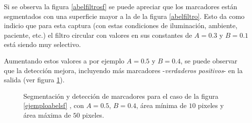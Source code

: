 Si se observa la figura \ref{abelfiltrosf} se puede apreciar que los marcadores están segmentados con una superficie mayor a la de la figura \ref{abelfiltro}.  Esto da como indicio que para esta captura (con estas condiciones de iluminación, ambiente, paciente, etc.) el filtro circular con valores en sus constantes de $A=0.3$ y $B=0.1$ está siendo muy selectivo.

Aumentando estos valores a por ejemplo $A=0.5$ y $B=0.4$, se puede observar que la detección mejora, incluyendo más marcadores -\textit{verdaderos positivos}- en la salida (ver figura \ref{ejemploabel2}).

\begin{figure}[H]
        \centering
        \hspace{5 mm}
  \caption{Segmentación y detección de marcadores para el caso de la figura \ref{ejemploabelsf} , con $A=0.5$, $B=0.4$, área mínima de $10$ pixeles y área máxima de $50$ pixeles.}
      \label{ejemploabel2}
\end{figure}

